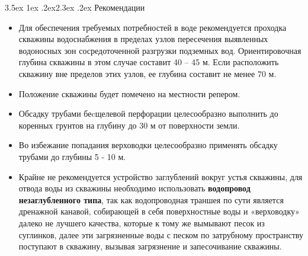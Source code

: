 \documentclass[a4paper,12pt]{article} %
\makeatletter
\renewcommand\section{\@startsection {section}{1}{\parindent}%
	{3.5ex \@plus 1ex \@minus .2ex}{2.3ex \@plus.2ex}%
	{\normalfont\hyphenpenalty=10000\Large\bfseries}}
\makeatother
\begin{document}
\section{Рекомендации}
\begin{itemize}
\item Для обеспечения требуемых потребностей в воде рекомендуется проходка скважины водоснабжения в пределах узлов пересечения выявленных водоносных зон сосредоточенной разгрузки подземных вод. Ориентировочная глубина скважины в этом случае составит 40 – 45 м. Если расположить скважину вне пределов этих узлов, ее глубина составит не менее 70 м.
\item Положение скважины будет помечено на местности репером.
\item Обсадку трубами беcщелевой перфорации целесообразно выполнить  до коренных грунтов на глубину до 30  м от поверхности земли.
\item Во избежание попадания верховодки целесообразно применять обсадку трубами до глубины 5 - 10 м. 
\item Крайне не рекомендуется устройство заглублений вокруг устья скважины, для отвода воды из скважины необходимо использовать \textbf{водопровод  незаглубленного типа}, так как водопроводная траншея по сути является дренажной канавой, собирающей в себя поверхностные воды и «верховодку» далеко не лучшего качества, которые к тому же вымывают песок из суглинков, далее эти загрязненные воды с песком по затрубному пространству поступают в скважину, вызывая загрязнение и запесочивание скважины.
\end{itemize}
\end{document}
